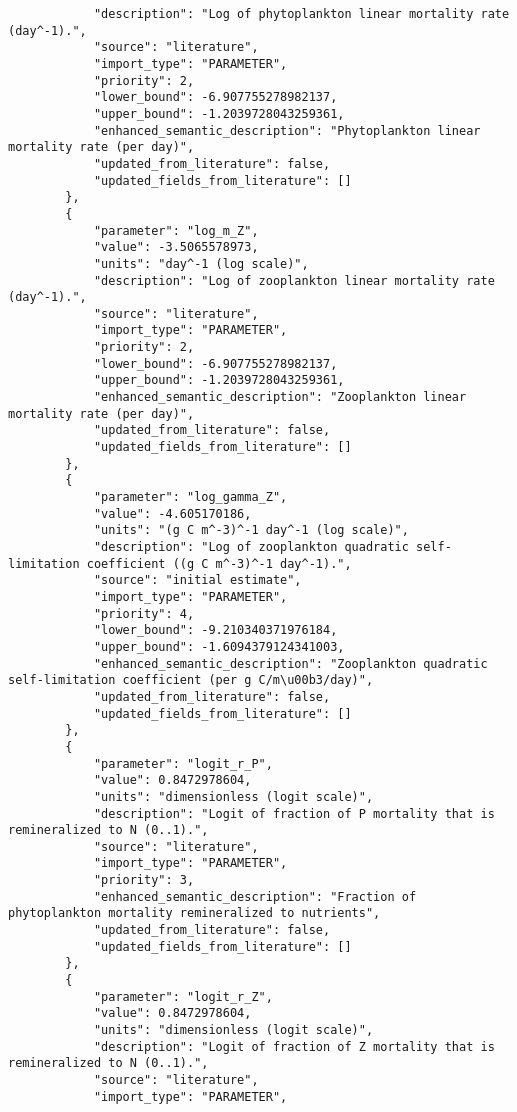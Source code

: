 \begin{lstlisting}
            "description": "Log of phytoplankton linear mortality rate (day^-1).",
            "source": "literature",
            "import_type": "PARAMETER",
            "priority": 2,
            "lower_bound": -6.907755278982137,
            "upper_bound": -1.2039728043259361,
            "enhanced_semantic_description": "Phytoplankton linear mortality rate (per day)",
            "updated_from_literature": false,
            "updated_fields_from_literature": []
        },
        {
            "parameter": "log_m_Z",
            "value": -3.5065578973,
            "units": "day^-1 (log scale)",
            "description": "Log of zooplankton linear mortality rate (day^-1).",
            "source": "literature",
            "import_type": "PARAMETER",
            "priority": 2,
            "lower_bound": -6.907755278982137,
            "upper_bound": -1.2039728043259361,
            "enhanced_semantic_description": "Zooplankton linear mortality rate (per day)",
            "updated_from_literature": false,
            "updated_fields_from_literature": []
        },
        {
            "parameter": "log_gamma_Z",
            "value": -4.605170186,
            "units": "(g C m^-3)^-1 day^-1 (log scale)",
            "description": "Log of zooplankton quadratic self-limitation coefficient ((g C m^-3)^-1 day^-1).",
            "source": "initial estimate",
            "import_type": "PARAMETER",
            "priority": 4,
            "lower_bound": -9.210340371976184,
            "upper_bound": -1.6094379124341003,
            "enhanced_semantic_description": "Zooplankton quadratic self-limitation coefficient (per g C/m\u00b3/day)",
            "updated_from_literature": false,
            "updated_fields_from_literature": []
        },
        {
            "parameter": "logit_r_P",
            "value": 0.8472978604,
            "units": "dimensionless (logit scale)",
            "description": "Logit of fraction of P mortality that is remineralized to N (0..1).",
            "source": "literature",
            "import_type": "PARAMETER",
            "priority": 3,
            "enhanced_semantic_description": "Fraction of phytoplankton mortality remineralized to nutrients",
            "updated_from_literature": false,
            "updated_fields_from_literature": []
        },
        {
            "parameter": "logit_r_Z",
            "value": 0.8472978604,
            "units": "dimensionless (logit scale)",
            "description": "Logit of fraction of Z mortality that is remineralized to N (0..1).",
            "source": "literature",
            "import_type": "PARAMETER",

\end{lstlisting}
